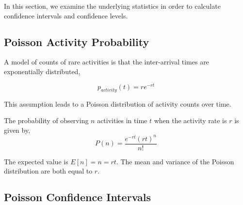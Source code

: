 \documentclass{article}
\begin{document}
In this section, we examine the underlying statistics in order to calculate confidence intervals and confidence levels.

\subsection{Poisson Activity Probability} 
\label{poisson}

A
\reversemarginpar\marginpar{\raggedleft
%
    \begin{tikzpicture}[scale=0.26]]
\draw [red, very thick, rotate around={60: (0, 0)}] (-0.7, -0.7) rectangle(0.7, 0.7);
%
\draw [very thick, <->] (0.25000000000000006, 0.4330127018922193) -- (1.25, 2.165063509461097) ;
\draw [very thick, <->] (1.75, 2.165063509461097) -- (2.75, 0.4330127018922193) ;
\draw [very thick, <->] (2.5, 0) -- (0.5, 0) ;
%
\draw [orange, ultra thick] (0,0) circle [radius= 0.5 ];
\draw [yellow, ultra thick] ( 1.5 , 2.59807621135 ) circle [radius= 0.5 ];
\draw [green,  ultra thick] ( 3.0 , 0 ) circle [radius= 0.5 ];
    \end{tikzpicture}
%
%
}
model of counts of rare activities is that the inter-arrival times are exponentially distributed, 

\begin{equation}
    \label{eq:tbe}
    p_{activity}(t) = r e^{-r t}
\end{equation}

This assumption leads to a Poisson distribution of activity counts over time.

The probability of observing $n$ activities in time $t$ when the activity rate is $r$ is given by,
\begin{equation}
    \label{eq:poisson}
    P(n) = \frac{e^{-r t} (r t)^n}{n!}
\end{equation}

The expected value is $E[n]=n=rt$. The mean and variance of the Poisson distribution are both equal to $r$.

\subsection{Poisson Confidence Intervals} 
\label{conf}
\end{document}
